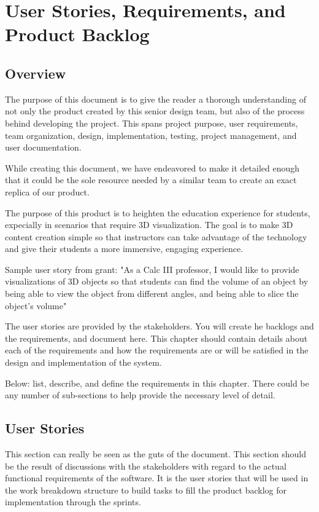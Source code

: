 
\chapter{User Stories,  Requirements, and Product Backlog}
\section{Overview}


The purpose of this document is to give the reader a thorough 
understanding of not only the product created by this senior design
team, but also of the process behind developing the project. This 
spans project purpose, user requirements, team organization, design,
implementation, testing, project management, and user documentation.

While creating this document, we have endeavored to make it detailed 
enough that it could be the sole resource needed by a similar team 
to create an exact replica of our product. 

The purpose of this product is to heighten the education experience 
for students, expecially in scenarios that require 3D visualization.
The goal is to make 3D content creation simple so that instructors 
can take advantage of the technology and give their students a more 
immersive, engaging experience.


Sample user story from grant: 
"As a Calc III professor, I would like to provide visualizations of 3D objects 
so that students can find the volume of an object by being able to view the object from 
different angles, and being able to slice the object's volume"

The user stories are provided by the stakeholders. You will create he backlogs 
and the requirements, and document here. This chapter should contain details 
about each of the requirements and how the requirements are or will be 
satisfied in the design and implementation of the system.

Below: list, describe, and define the requirements in this chapter.  There 
could be any number of sub-sections to help provide the necessary level of
detail. 




\section{User Stories}
This section can really be seen as the guts of the document.  This section should 
be the result of discussions with the stakeholders with regard to the actual functional 
requirements of the software.  It is the user stories that will be used in the 
work breakdown structure to build tasks to fill the product backlog for implementation 
through the sprints.

